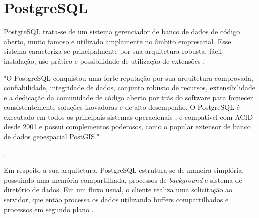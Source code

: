 \section{PostgreSQL}
\label{sec:postgresql}
PostgreSQL	trata-se de um sistema gerenciador de banco de dados de código aberto, muito famoso e utilizado amplamente no âmbito empresarial. Esse sistema caracteriza-se principalmente por sua arquitetura robusta, fácil instalação, uso prático e possibilidade de utilização de extensões \cite{PostgreSQL2023}.

\begin{citacao}
    "O PostgreSQL conquistou uma forte reputação por sua arquitetura comprovada, confiabilidade, integridade de dados, conjunto robusto de recursos, extensibilidade e a dedicação da comunidade de código aberto por trás do software para fornecer consistentemente soluções inovadoras e de alto desempenho. O PostgreSQL é executado em todos os principais sistemas operacionais , é compatível com ACID desde 2001 e possui complementos poderosos, como o popular extensor de banco de dados geoespacial PostGIS."

    .
\end{citacao}

Em respeito a sua arquitetura, PostgreSQL estrutura-se de maneira simplória, possuindo uma memória compartilhada, processos de \textit{background} e sistema de diretório de dados. Em um fluxo usual, o cliente realiza uma solicitação ao servidor, que então processa os dados utilizando buffers compartilhados e processos em segundo plano \cite{Kinsta2023}.
